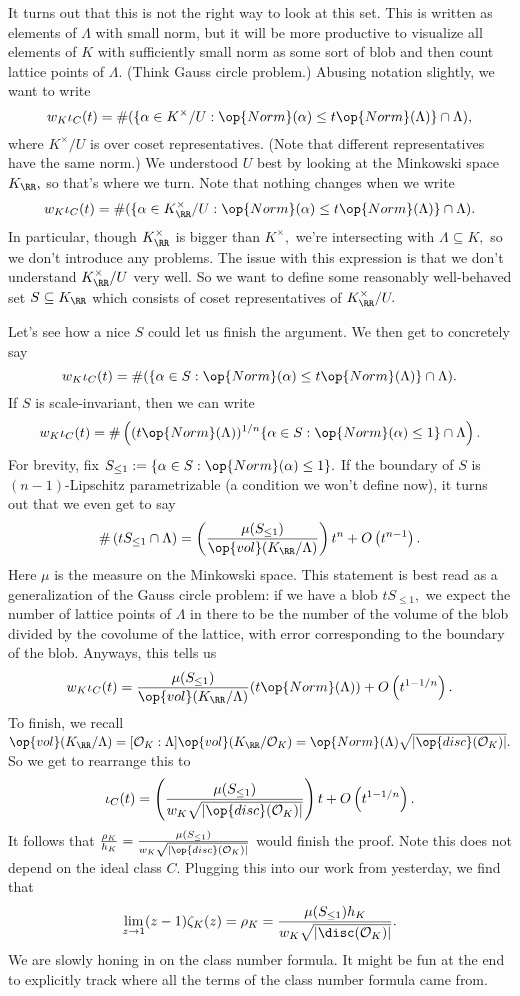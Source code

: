 It turns out that this is not the right way to look at this set. This is written as elements of $\Lambda$ with small norm, but it will be more productive to visualize all elements of $K$ with sufficiently small norm as some sort of blob and then count lattice points of $\Lambda.$ (Think Gauss circle problem.) Abusing notation slightly, we want to write
\[w_K\iota_C(t)=\#(\{\alpha\in K^\times/U:\op{Norm}(\alpha)\le t\op{Norm}(\Lambda)\}\cap\Lambda),\]
where $K^\times/U$ is over coset representatives. (Note that different representatives have the same norm.) We understood $U$ best by looking at the Minkowski space $K_\RR,$ so that's where we turn. Note that nothing changes when we write
\[w_K\iota_C(t)=\#(\{\alpha\in K_\RR^\times/U:\op{Norm}(\alpha)\le t\op{Norm}(\Lambda)\}\cap\Lambda).\]
In particular, though $K_\RR^\times$ is bigger than $K^\times,$ we're intersecting with $\Lambda\subseteq K,$ so we don't introduce any problems. The issue with this expression is that we don't understand $K_\RR^\times/U$ very well. So we want to define some reasonably well-behaved set $S\subseteq K_\RR$ which consists of coset representatives of $K_\RR^\times/U.$

Let's see how a nice $S$ could let us finish the argument. We then get to concretely say
\[w_K\iota_C(t)=\#(\{\alpha\in S:\op{Norm}(\alpha)\le t\op{Norm}(\Lambda)\}\cap\Lambda).\]
If $S$ is scale-invariant, then we can write
\[w_K\iota_C(t)=\#\left((t\op{Norm}(\Lambda))^{1/n}\{\alpha\in S:\op{Norm}(\alpha)\le1\}\cap\Lambda\right).\]
For brevity, fix $S_{\le1}:=\{\alpha\in S:\op{Norm}(\alpha)\le1\}.$ If the boundary of $S$ is $(n-1)$-Lipschitz 
parametrizable (a condition we won't define now), it turns out that we even get to say
\[\#\left(tS_{\le1}\cap\Lambda\right)=\left(\frac{\mu(S_{\le1})}{\op{vol}(K_\RR/\Lambda)}\right)t^n+O\left(t^{n-1}\right).\]
Here $\mu$ is the measure on the Minkowski space. This statement is best read as a generalization of the Gauss circle problem: if we have a blob $tS_{\le1},$ we expect the number of lattice points of $\Lambda$ in there to be the number of the volume of the blob divided by the covolume of the lattice, with error corresponding to the boundary of the blob. Anyways, this tells us
\[w_K\iota_C(t)=\frac{\mu(S_{\le1})}{\op{vol}(K_\RR/\Lambda)}(t\op{Norm}(\Lambda))+O\left(t^{1-1/n}\right).\]
To finish, we recall $\op{vol}(K_\RR/\Lambda)=[\mathcal O_K:\Lambda]\op{vol}(K_\RR/\mathcal O_K)=\op{Norm}(\Lambda)\sqrt{|\op{disc}(\mathcal O_K)|}.$ So we get to rearrange this to
\[\iota_C(t)=\left(\frac{\mu(S_{\le1})}{w_K\sqrt{|\op{disc}(\mathcal O_K)|}}\right)t+O\left(t^{1-1/n}\right).\]
It follows that $\frac{\rho_K}{h_K}=\frac{\mu(S_{\le1})}{w_K\sqrt{|\op{disc}(\mathcal O_K)|}}$ would finish the proof. Note this does not depend on the ideal class $C.$ Plugging this into our work from yesterday, we find that
\[\lim_{z\to1}(z-1)\zeta_K(z)=\rho_K=\frac{\mu(S_{\le1})h_K}{w_K\sqrt{|\disc(\mathcal O_K)|}}.\]
We are slowly honing in on the class number formula. It might be fun at the end to explicitly track where all the terms of the class number formula came from.

